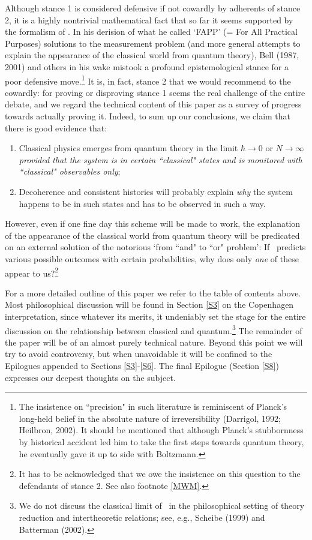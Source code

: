 \documentclass[12pt,titlepage]{article}
\newcommand{\raw}{\rightarrow} \newcommand{\rat}{\mapsto}
\begin{document}
Although stance 1 is considered defensive if not cowardly by adherents of stance 2, it is a highly nontrivial mathematical fact that so far it seems supported by the formalism of \qm. In his derision  of what he called `FAPP' (= For All Practical Purposes) solutions to the 
measurement problem (and more general attempts to explain the appearance of the classical world from quantum theory), Bell (1987, 2001)  and others in his wake mistook a profound epistemological stance for a poor defensive move.\footnote{The insistence on ``precision" in such literature is reminiscent of Planck's long-held belief in the absolute nature of irreversibility (Darrigol, 1992; Heilbron, 2002). It should be mentioned that although Planck's stubbornness by historical accident led him to take the first steps towards quantum theory, he eventually gave it up to side with Boltzmann.} It is, in fact, stance 2 that we would recommend to the cowardly: for 
 proving  or disproving stance 1 seems the real challenge of the entire debate, and we regard the technical content of this paper as a survey of progress towards actually proving it. Indeed, to sum up our conclusions, we claim that there is good evidence that:
\begin{enumerate}
\item Classical physics emerges from quantum theory in the limit $\hbar\rightarrow 0$ or  $N\raw\infty$ {\it provided that the system is in certain ``classical" states and is monitored 
with ``classical" observables only};
\item Decoherence and consistent histories will probably  explain  {\it why} the system happens to be in such states and has to be observed in such a way.
\end{enumerate}
However, even if one fine day this scheme will be made to work, the explanation of the appearance of the classical world from quantum theory will be predicated on an external solution of the notorious `from ``and" to ``or" problem': If \qm\ predicts various possible outcomes with certain probabilities, why does only {\it one} of these appear to us?\footnote{It has to be acknowledged that we owe the insistence on this question to the defendants of stance 2.
See also footnote \ref{MWM}.}

For a more detailed outline of this paper we refer to the table of contents above. Most philosophical discussion will be found in Section \ref{S3} on the Copenhagen interpretation, since whatever its merits, it undeniably set the stage for the entire discussion on the relationship between classical and quantum.\footnote{We do not discuss the classical limit of \qm\ in the philosophical setting of theory reduction and intertheoretic relations;
see, e.g.,  Scheibe (1999) and Batterman (2002).}
 The remainder of the paper will be of an almost purely technical nature. Beyond this point we will  try to avoid controversy, but 
when unavoidable it will be  confined to the Epilogues appended to Sections \ref{S3}-\ref{S6}. 
The final Epilogue (Section \ref{S8}) expresses our deepest thoughts on the subject. 
\end{document}
